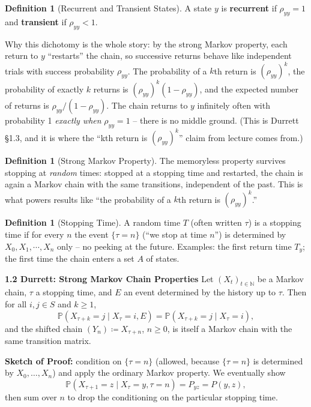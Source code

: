 \documentclass[11pt]{article}
\newcommand{\1}{\mathbf{1}}
\theoremstyle{notestyle}
\theoremstyle{definition}
\newtheorem{definition}[theorem]{Definition}
\begin{document}
\begin{definition}[Recurrent and Transient States]
\label{def:recurrent-transient}
A state $y$ is \textbf{recurrent} if $\rho_{yy} = 1$ and \textbf{transient} if
$\rho_{yy} < 1$.
\end{definition}
\par Why this dichotomy is the whole story: by the strong Markov property, each
return to $y$ ``restarts'' the chain, so successive returns behave like
independent trials with success probability $\rho_{yy}$. The probability of a
$k$th return is $(\rho_{yy})^{k}$, the probability of exactly $k$ returns is
$(\rho_{yy})^{k}(1 - \rho_{yy})$, and the expected number of returns is
$\rho_{yy}/(1 - \rho_{yy})$. The chain returns to $y$ infinitely often with
probability 1 \emph{exactly when} $\rho_{yy} = 1$ -- there is no middle ground.
(This is Durrett \S1.3, and it is where the ``kth return is $(\rho_{yy})^{k}$''
claim from lecture comes from.)
\begin{definition}[Strong Markov Property]
\label{def:label}
The memoryless property survives stopping at \emph{random} times: stopped at a
stopping time and restarted, the chain is again a Markov chain with the same
transitions, independent of the past. This is what powers results like ``the
probability of a $k$th return is $(\rho_{yy})^{k}$.''
\end{definition}
\begin{definition}[Stopping Time]
\label{def:label}
A random time $T$ (often written $\tau$) is a stopping time if for every $n$ the
event $\{\tau = n\}$ (``we stop at time $n$'') is determined by
$X_0, X_1, \cdots, X_n$ only -- no peeking at the future. Examples: the first
return time $T_y$; the first time the chain enters a set $A$ of states.
\end{definition}
\newpage
\textbf{1.2 Durrett: Strong Markov Chain Properties}
Let $(X_t)_{t \in \mathbb{N}}$ be a Markov chain, $\tau$ a stopping time, and $E$ an
event determined by the history up to $\tau$. Then for all $i, j \in S$ and $k \ge 1$,
$$\mathbb{P}(X_{\tau + k} = j \mid X_{\tau} = i, E) = \mathbb{P}(X_{\tau + k} = j \mid X_{\tau} = i),$$
and the shifted chain $(Y_n) \coloneqq X_{\tau + n}$, $n \ge 0$, is itself a Markov
chain with the same transition matrix.
\par \textbf{Sketch of Proof: } condition on $\{\tau = n\}$ (allowed, because
$\{\tau = n\}$ is determined by $X_0, \dots, X_n$) and apply the ordinary Markov
property. We eventually show
$$\mathbb{P}(X_{\tau + 1} = z \mid X_{\tau} = y, \tau = n) = P_{yz} = P(y,z),$$
then sum over $n$ to drop the conditioning on the particular stopping time.
\end{document}
